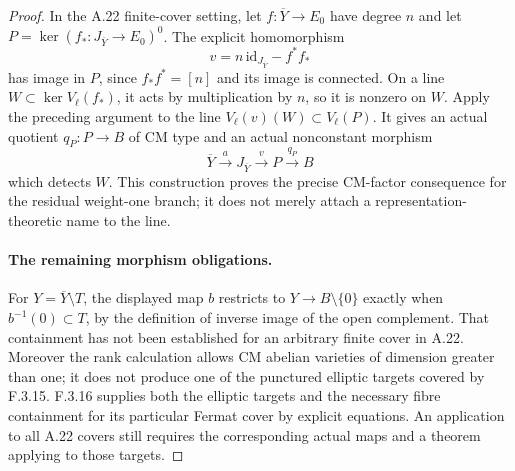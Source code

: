 \begin{proof}
In the A.22 finite-cover setting, let
$f:\overline Y\to E_0$ have degree $n$ and let
$P=\ker(f_*:J_{\overline Y}\to E_0)^0$.
The explicit homomorphism
\[
 v=n\,\mathrm{id}_{J_{\overline Y}}-f^*f_*
\]
has image in $P$, since $f_*f^*=[n]$ and its image is connected.
On a line $W\subset\ker V_\ell(f_*)$, it acts by multiplication by
$n$, so it is nonzero on $W$. Apply the preceding argument to the
line $V_\ell(v)(W)\subset V_\ell(P)$. It gives an actual quotient
$q_P:P\to B$ of CM type and an actual nonconstant morphism
\[
 \overline Y\xrightarrow{a}J_{\overline Y}
 \xrightarrow{v}P\xrightarrow{q_P}B
\]
which detects $W$. This construction proves the precise CM-factor
consequence for the residual weight-one branch; it does not merely
attach a representation-theoretic name to the line.

\paragraph{The remaining morphism obligations.}
For $Y=\overline Y\setminus T$, the displayed map $b$ restricts to
$Y\to B\setminus\{0\}$ exactly when $b^{-1}(0)\subset T$, by the
definition of inverse image of the open complement. That containment
has not been established for an arbitrary finite cover in A.22.
Moreover the rank calculation allows CM abelian varieties of dimension
greater than one; it does not produce one of the punctured elliptic
targets covered by F.3.15. F.3.16 supplies both the elliptic targets and
the necessary fibre containment for its particular Fermat cover by
explicit equations. An application to all A.22 covers still requires
the corresponding actual maps and a theorem applying to those targets.
\end{proof}

